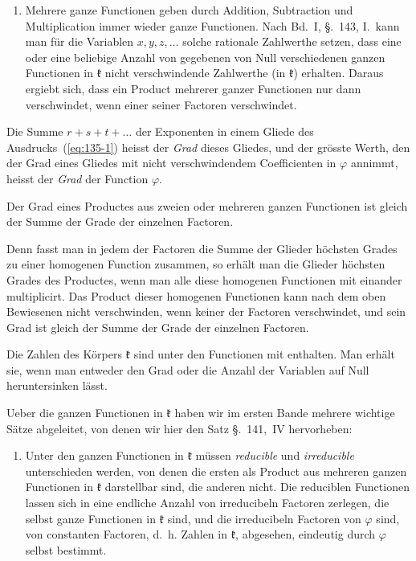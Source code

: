 \documentclass[12pt,a4paper]{article}
\theoremstyle{definition}
\begin{document}
\begin{enumerate}[label=\arabic*.]
\item Mehrere ganze Functionen geben durch Addition, Subtraction und Multiplication immer wieder ganze Functionen. Nach Bd.~I, \S.~143, I.\ kann man für die Variablen $x,y,z,\dots$ solche rationale Zahlwerthe setzen, dass eine oder eine beliebige Anzahl von gegebenen von Null verschiedenen ganzen Functionen in $\mathfrak{k}$ nicht verschwindende Zahlwerthe (in $\mathfrak{k}$) erhalten. Daraus ergiebt sich, dass ein Product mehrerer ganzer Functionen nur dann verschwindet, wenn einer seiner Factoren verschwindet.
\end{enumerate}

Die Summe $r+s+t+\dots$ der Exponenten in einem Gliede des Ausdrucks~(\ref{eq:135-1}) heisst der \emph{Grad} dieses Gliedes, und der grösste Werth, den der Grad eines Gliedes mit nicht verschwindendem Coefficienten in $\varphi$ annimmt, heisst der \emph{Grad} der Function $\varphi$.

Der Grad eines Productes aus zweien oder mehreren ganzen Functionen ist gleich der Summe der Grade der einzelnen Factoren.

Denn fasst man in jedem der Factoren die Summe der Glieder höchsten Grades zu einer homogenen Function zusammen, so erhält man die Glieder höchsten Grades des Productes, wenn man alle diese homogenen Functionen mit einander multiplicirt. Das Product dieser homogenen Functionen kann nach dem oben Bewiesenen nicht verschwinden, wenn keiner der Factoren verschwindet, und sein Grad ist gleich der Summe der Grade der einzelnen Factoren.

Die Zahlen des Körpers $\mathfrak{k}$ sind unter den Functionen mit enthalten. Man erhält sie, wenn man entweder den Grad oder die Anzahl der Variablen auf Null heruntersinken lässt.

Ueber die ganzen Functionen in $\mathfrak{k}$ haben wir im ersten Bande mehrere wichtige Sätze abgeleitet, von denen wir hier den Satz \S.~141,~IV hervorheben:

\begin{enumerate}[label=\arabic*., resume]
\item Unter den ganzen Functionen in $\mathfrak{k}$ müssen \emph{reducible} und \emph{irreducible} unterschieden werden, von denen die ersten als Product aus mehreren ganzen Functionen in $\mathfrak{k}$ darstellbar sind, die anderen nicht. Die reduciblen Functionen lassen sich in eine endliche Anzahl von irreducibeln Factoren zerlegen, die selbst ganze Functionen in $\mathfrak{k}$ sind, und die irreducibeln Factoren von $\varphi$ sind, von constanten Factoren, d.~h. Zahlen in $\mathfrak{k}$, abgesehen, eindeutig durch $\varphi$ selbst bestimmt.
\end{enumerate}
\end{document}
